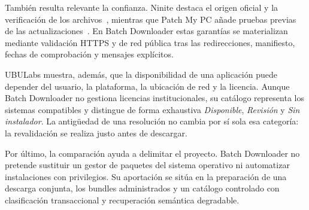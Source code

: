 También resulta relevante la confianza. Ninite destaca el origen oficial y la verificación de los archivos~\cite{ninite}, mientras que Patch My PC añade pruebas previas de las actualizaciones~\cite{patchmypc-home-updater}. En Batch Downloader estas garantías se materializan mediante validación HTTPS y de red pública tras las redirecciones, manifiesto, fechas de comprobación y mensajes explícitos.

UBULabs muestra, además, que la disponibilidad de una aplicación puede depender del usuario, la plataforma, la ubicación de red y la licencia. Aunque Batch Downloader no gestiona licencias institucionales, su catálogo representa los sistemas compatibles y distingue de forma exhaustiva \emph{Disponible}, \emph{Revisión} y \emph{Sin instalador}. La antigüedad de una resolución no cambia por sí sola esa categoría: la revalidación se realiza justo antes de descargar.

Por último, la comparación ayuda a delimitar el proyecto. Batch Downloader no pretende sustituir un gestor de paquetes del sistema operativo ni automatizar instalaciones con privilegios. Su aportación se sitúa en la preparación de una descarga conjunta, los bundles administrados y un catálogo controlado con clasificación transaccional y recuperación semántica degradable.
